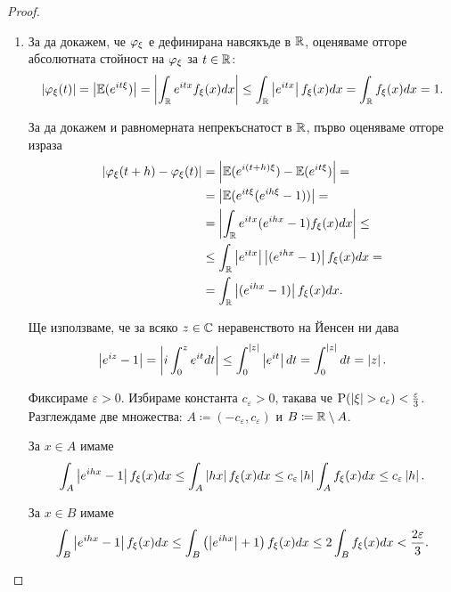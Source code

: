 \documentclass[numbers=endperiod, bibliography=totocnumbered]{scrartcl}
\begin{document}
\begin{proof}
  \mbox{}
  \begin{enumerate}
    \item За да докажем, че \( \varphi_\xi \) е дефинирана навсякъде в \( \mathbb{R} \), оценяваме отгоре абсолютната стойност на \( \varphi_\xi \) за \( t \in \mathbb{R} \):
    \begin{align*}
      \left\vert \varphi_\xi(t) \right\vert
      =
      \left\vert \mathbb{E}(e^{it\xi}) \right\vert
      =
      \left\vert \int_{\mathbb{R}} e^{itx} f_\xi(x) dx \right\vert
      \leq
      \int_{\mathbb{R}} \left\vert e^{itx} \right\vert f_\xi(x) dx
      =
      \int_{\mathbb{R}} f_\xi(x) dx
      =
      1.
    \end{align*}

    За да докажем и равномерната непрекъснатост в \( \mathbb{R} \), първо оценяваме отгоре израза
    \begin{align*}
      \left\vert \varphi_\xi(t + h) - \varphi_\xi(t) \right\vert
      &=
      \left\vert \mathbb{E}(e^{i(t + h)\xi}) - \mathbb{E}(e^{it\xi}) \right\vert
      = \\ &=
      \left\vert \mathbb{E}(e^{it\xi} (e^{ih\xi} - 1)) \right\vert
      = \\ &=
      \left\vert \int_{\mathbb{R}} e^{itx} (e^{ihx} - 1) f_\xi(x) dx \right\vert
      \leq \\ &\leq
      \int_{\mathbb{R}} \left\vert e^{itx} \right\vert \left\vert (e^{ihx} - 1) \right\vert f_\xi(x) dx
      = \\ &=
      \int_{\mathbb{R}} \left\vert (e^{ihx} - 1) \right\vert f_\xi(x) dx.
    \end{align*}

    Ще използваме, че за всяко \( z \in \mathbb{C} \) неравенството на Йенсен ни дава
    \begin{align*}
      \left\vert e^{iz} - 1 \right\vert
      =
      \left\vert i \int_0^z e^{it} dt \right\vert
      \leq
      \int_0^{\left\vert z \right\vert} \left\vert e^{it} \right\vert dt
      =
      \int_0^{\left\vert z \right\vert} dt
      =
      \left\vert z \right\vert.
    \end{align*}

    Фиксираме \( \varepsilon > 0 \). Избираме константа \( c_\varepsilon > 0 \), такава че \( \operatorname{P}(\left\vert \xi \right\vert > c_\varepsilon) < \frac \varepsilon 3 \).
    Разглеждаме две множества: \( A \coloneqq (-c_\varepsilon, c_\varepsilon) \) и \( B \coloneqq \mathbb{R} \setminus A \).

    За \( x \in A \) имаме
    \begin{align*}
      \int_A \left\vert e^{ihx} - 1 \right\vert f_\xi(x) dx
      \leq
      \int_A \left\vert h x \right\vert f_\xi(x) dx
      \leq
      c_\varepsilon \left\vert h \right\vert \int_A f_\xi(x) dx
      \leq
      c_\varepsilon \left\vert h \right\vert.
    \end{align*}

    За \( x \in B \) имаме
    \begin{align*}
      \int_B \left\vert e^{ihx} - 1 \right\vert f_\xi(x) dx
      \leq
      \int_B \left( \left\vert e^{ihx} \right\vert + 1 \right) f_\xi(x) dx
      \leq
      2 \int_B f_\xi(x) dx
      <
      \frac {2\varepsilon} 3.
    \end{align*}


\end{enumerate}
\end{proof}
\end{document}
